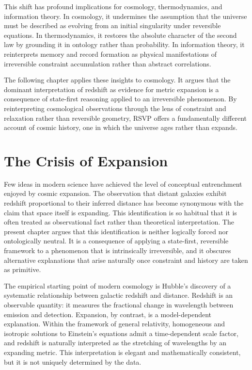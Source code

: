 \documentclass[11pt,oneside]{book}
\begin{document}
This shift has profound implications for cosmology, thermodynamics, and information theory. In cosmology, it undermines the assumption that the universe must be described as evolving from an initial singularity under reversible equations. In thermodynamics, it restores the absolute character of the second law by grounding it in ontology rather than probability. In information theory, it reinterprets memory and record formation as physical manifestations of irreversible constraint accumulation rather than abstract correlations.

The following chapter applies these insights to cosmology. It argues that the dominant interpretation of redshift as evidence for metric expansion is a consequence of state-first reasoning applied to an irreversible phenomenon. By reinterpreting cosmological observations through the lens of constraint and relaxation rather than reversible geometry, RSVP offers a fundamentally different account of cosmic history, one in which the universe ages rather than expands.

\chapter{The Crisis of Expansion}

Few ideas in modern science have achieved the level of conceptual entrenchment enjoyed by cosmic expansion. The observation that distant galaxies exhibit redshift proportional to their inferred distance has become synonymous with the claim that space itself is expanding. This identification is so habitual that it is often treated as observational fact rather than theoretical interpretation. The present chapter argues that this identification is neither logically forced nor ontologically neutral. It is a consequence of applying a state-first, reversible framework to a phenomenon that is intrinsically irreversible, and it obscures alternative explanations that arise naturally once constraint and history are taken as primitive.

The empirical starting point of modern cosmology is Hubble’s discovery of a systematic relationship between galactic redshift and distance. Redshift is an observable quantity: it measures the fractional change in wavelength between emission and detection. Expansion, by contrast, is a model-dependent explanation. Within the framework of general relativity, homogeneous and isotropic solutions to Einstein’s equations admit a time-dependent scale factor, and redshift is naturally interpreted as the stretching of wavelengths by an expanding metric. This interpretation is elegant and mathematically consistent, but it is not uniquely determined by the data.
\end{document}
